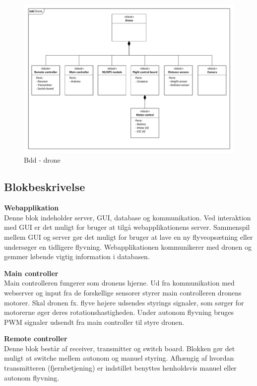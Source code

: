 \begin{figure}[H]
\centering
\includegraphics[width=1.\textwidth]{Billeder/BDD/bdd_drone.pdf}
\vspace{-0.7cm}
\caption{Bdd - drone}
\label{fig:bdd_drone}
\end{figure}

\newpage

\subsection{Blokbeskrivelse}

\textbf{Webapplikation}\\
Denne blok indeholder server, GUI, database og kommunikation. 
Ved interaktion med GUI er det muligt for bruger at tilgå webapplikationens server. Sammenspil mellem GUI og server gør det muligt for bruger at lave en ny flyveopsætning eller undersøger en tidligere flyvning. Webapplikationen kommunikerer med dronen og gemmer løbende vigtig information i databasen.

\textbf{Main controller}\\
Main controlleren fungerer som dronens hjerne. Ud fra kommunikation med webserver og input fra de forskellige sensorer styrer main controlleren dronens motorer. Skal dronen fx. flyve højere udsendes styrings signaler, som sørger for motorerne øger deres rotationshastigheden. Under autonom flyvning bruges PWM signaler udsendt fra main controller til styre dronen. 

\textbf{Remote controller}\\
Denne blok består af receiver, transmitter og switch board. Blokken gør det muligt at switche mellem autonom og manuel styring. Afhængig af hvordan transmitteren (fjernbetjening) er indstillet benyttes henholdsvis manuel eller autonom flyvning.

